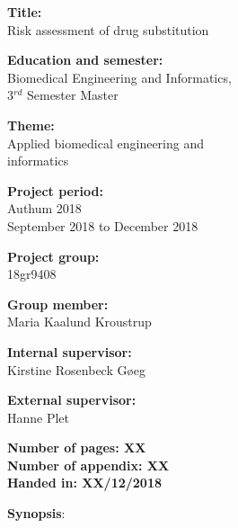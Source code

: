 \begin{minipage}[t]{0.48\textwidth}
\textbf{Title:} \\[5pt]\bigskip\hspace{2ex}
Risk assessment of drug substitution

\textbf{Education and semester:} \\[5pt]\bigskip\hspace{2ex}
Biomedical Engineering and Informatics, \\ \bigskip\hspace{2ex} 3$^{rd}$ Semester Master

\textbf{Theme:} \\[5pt]\bigskip\hspace{2ex}
Applied biomedical engineering and  \\ \bigskip\hspace{2ex} informatics


\vspace*{2mm}

\textbf{Project period:} \\[5pt]\bigskip\hspace{2ex}
Authum 2018  \\ \bigskip\hspace{2ex} September 2018 to December 2018

\textbf{Project group:} \\[5pt]\bigskip\hspace{2ex}
18gr9408

\textbf{Group member:} \\[5pt]\hspace*{2ex}
Maria Kaalund Kroustrup

\vspace*{5mm}

\textbf{Internal supervisor:} \\[5pt]\hspace*{2ex}
Kirstine Rosenbeck Gøeg 

\vspace*{2mm}

\textbf{External supervisor:} \\[5pt]\hspace*{2ex}
Hanne Plet\\\bigskip\hspace{2ex}


\textbf{Number of pages: XX} \\
\textbf{Number of appendix: XX} \\ 
\textbf{Handed in: XX/12/2018}

\end{minipage}
\hfill
\begin{minipage}[t]{0.483\textwidth}
\textbf{Synopsis}: \\[5pt]
\fbox{\parbox{7cm}{\bigskip\bigskip}}
\end{minipage}

